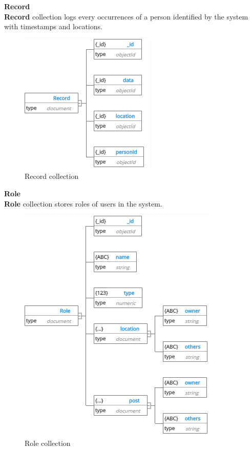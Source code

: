 \cleardoublepage
\textbf{Record}\\
\textbf{Record} collection logs every occurrences of a person identified by the system with timestamps and locations.
\begin{center}
	\begin{figure}[H]
		\centering
		\includegraphics[width=0.7\columnwidth]{images/chap4/Record.png}
		\caption{Record collection}
	\end{figure}
\end{center}
\cleardoublepage
\textbf{Role}\\
\textbf{Role} collection stores roles of users in the system.
\begin{center}
	\begin{figure}[H]
		\centering
		\includegraphics[width=0.7\columnwidth]{images/chap4/Role.png}
		\caption{Role collection}
	\end{figure}
\end{center}
\cleardoublepage
